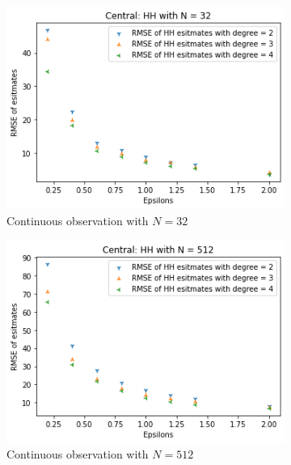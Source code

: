 \documentclass[11pt]{article}
\theoremstyle{definition}
\begin{document}
\begin{figure}[H]
     \centering
     \begin{subfigure}[b]{0.3\textwidth}
         \centering
         \includegraphics[width=\textwidth]{figures/hh_cen_epsi/hh_N=32.png}
         \caption{Continuous observation with $N=32$}
         \label{fig:a}
     \end{subfigure}
     \hfill
     \begin{subfigure}[b]{0.3\textwidth}
         \centering
         \includegraphics[width=\textwidth]{figures/hh_cen_epsi/hh_N=512.png}
         \caption{Continuous observation with $N=512$}
         \label{fig:b1}
     \end{subfigure}
     \hfill
     \begin{subfigure}[b]{0.3\textwidth}

\end{subfigure}
\end{figure}
\end{document}
